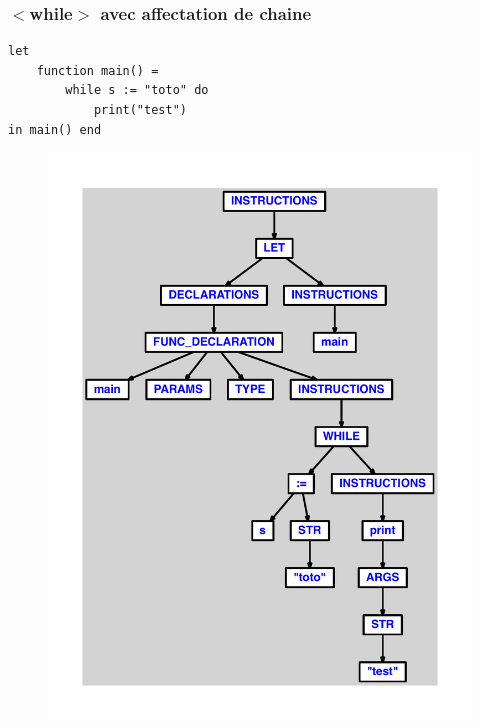 \documentclass{article}
\begin{document}
\subsubsection{$ < $while$ > $ avec affectation de chaine}
\begin{lstlisting}
let
	function main() =
		while s := "toto" do
			print("test")
in main() end
\end{lstlisting}
\newpage
\begin{figure}[H]
\centering
\includegraphics[max width=\textwidth]{ast/ast_324.pdf}
\end{figure}
\newpage
\end{document}
